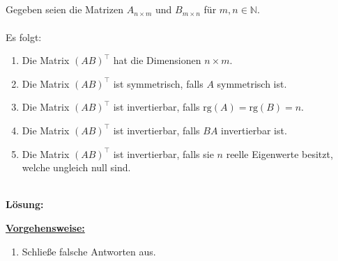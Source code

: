 \subsection*{}
Gegeben seien die Matrizen $ A_{n \times m} $ und $ B_{m \times n} $ für $ m,n \in \mathbb{N} $.\\
\\
Es folgt:
\renewcommand{\labelenumi}{(\alph{enumi})}
\begin{enumerate}
	\item 
	Die Matrix $ (AB)^\top $ hat die Dimensionen $ n \times m $.
	\item 
	Die Matrix $ (AB)^\top $ ist symmetrisch, falls $ A $ symmetrisch ist.
	\item 
	Die Matrix $ (AB)^\top $ ist invertierbar, falls $ \mathrm{rg}(A) = \mathrm{rg}(B) = n $.
	\item 
	Die Matrix $ (AB)^\top $ ist invertierbar, falls $ BA $ invertierbar ist.
	\item 
	Die Matrix $ (AB)^\top $ ist invertierbar, falls sie $ n $ reelle Eigenwerte besitzt, welche ungleich null sind.
\end{enumerate}
\ \\
\textbf{Lösung:}
\begin{mdframed}
\underline{\textbf{Vorgehensweise:}}
\renewcommand{\labelenumi}{\theenumi.}
\begin{enumerate}
\item Schließe falsche Antworten aus.
\end{enumerate}
\end{mdframed}

